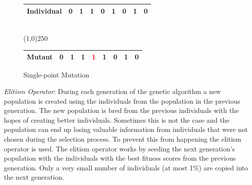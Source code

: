 \begin{figure}[H]
  \centering
  \begin{tabular}{ | p{2cm} | l | l | l | l | l | l | l | l | }
    \hline
    Individual & 0 & 1 & 1 & 0 & 1 & 0 & 1 & 0 \\
    \hline
  \end{tabular}
  \\
  \vspace{3 mm}
  \line(1,0){250}
  \\
  \vspace{3 mm}
  \begin{tabular}{ | p{2cm} | l | l | l | l | l | l | l | l | }
    \hline
    Mutant & 0 & 1 & 1 & \textcolor{red}{1} & 1 & 0 & 1 & 0 \\
    \hline
  \end{tabular}
  \caption{Single-point Mutation}
  \label{fig:mutation}
\end{figure}

\textit{Elitism Operator}: During each generation of the genetic algorithm a new population is created using the individuals from the population in the previous generation. The new population is bred from the previous individuals with the hopes of creating better individuals. Sometimes this is not the case and the population can end up losing valuable information from individuals that were not chosen during the selection process. To prevent this from happening the elitism operator is used. The elitism operator works by seeding the next generation's population with the individuals with the best fitness scores from the previous generation. Only a very small number of individuals (at most 1\%) are copied into the next generation.